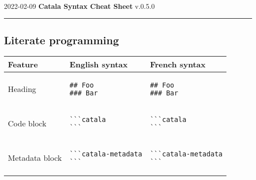 \documentclass[a3paper,landscape]{article}
\begin{document}
\begin{center}
  2022-02-09
  \hfill
  {\Huge\bfseries\sffamily
    Catala Syntax Cheat Sheet}
  \hfill
  v.0.5.0
\end{center}
\hrule

\begin{multicols*}{2}

  \section*{Literate programming}
  \begin{center}
    \begin{tabular}{p{}p{}p{}}
      \toprule
      Feature        & English syntax & French syntax \\\midrule
      Heading        &
      \vspace*{-1.75em}
      \begin{verbatim}
## Foo
### Bar
\end{verbatim}
      \vspace*{-1.75em}
                     &
      \vspace*{-1.75em}
      \begin{verbatim}
## Foo
### Bar
\end{verbatim}
      \vspace*{-1.75em}
      \\
      Code block     &
      \vspace*{-1.75em}
      \begin{verbatim}
```catala
```
\end{verbatim}
      \vspace*{-1.75em}
                     &
      \vspace*{-1.75em}
      \begin{verbatim}
```catala
```
\end{verbatim}
      \vspace*{-1.75em}
      \\
      Metadata block &
      \vspace*{-1.75em}
      \begin{verbatim}
```catala-metadata
```
\end{verbatim}
      \vspace*{-1.75em}
                     &
      \vspace*{-1.75em}
      \begin{verbatim}
```catala-metadata
```
\end{verbatim}

\end{tabular}
\end{center}
\end{multicols*}
\end{document}
